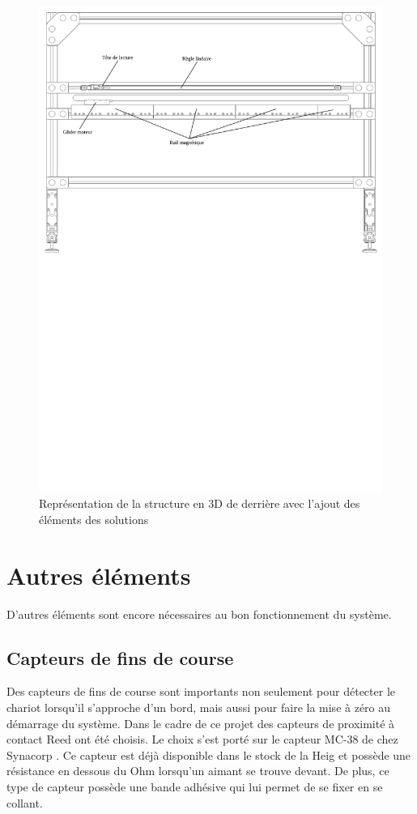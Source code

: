 \begin{figure}[H]
  \centering
  \includegraphics[width = \textwidth]{assets/figures/VueDerriere.svg}
  \caption{Représentation de la structure en 3D de derrière avec l'ajout des éléments des solutions}
  \label{fig:VueDerriere}
\end{figure}

\section{Autres éléments}\label{sec:AutreEle}
D'autres éléments sont encore nécessaires au bon fonctionnement du système.

\subsection{Capteurs de fins de course}
Des capteurs de fins de course sont importants non seulement pour détecter le chariot lorsqu'il s'approche d'un bord, mais aussi
pour faire la mise à zéro au démarrage du système. Dans le cadre de ce projet des capteurs de proximité à contact Reed ont été choisis.
Le choix s'est porté sur le capteur MC-38 de chez Synacorp \cite{Synacorp}. Ce capteur est déjà disponible dans le stock de la \acrshort{Heig}
et possède une résistance en dessous du Ohm lorsqu'un aimant se trouve devant. De plus, ce type de capteur possède une bande adhésive qui lui
permet de se fixer en se collant.

